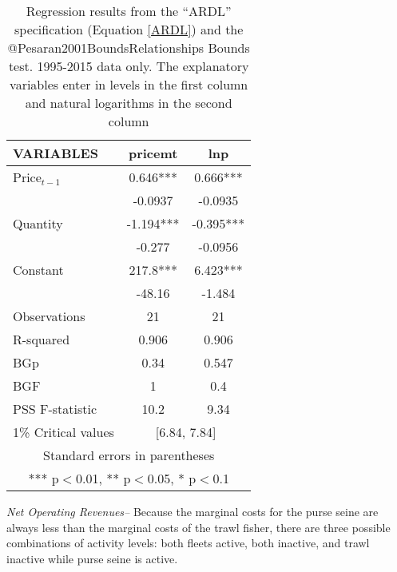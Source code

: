 \documentclass[]{article}
\begin{document}
\begin{table}[htbp]
\begin{center}
\begin{tabular}{lcc} \hline
VARIABLES       &   pricemt &   lnp \\\hline
Price$_{t-1}$       &   0.646***    &   0.666***    \\
        &   -0.0937 &   -0.0935 \\
Quantity        &   -1.194***   &   -0.395***   \\
        &   -0.277  &   -0.0956 \\
Constant        &   217.8***    &   6.423***    \\
        &   -48.16  &   -1.484  \\
Observations        &   21  &   21  \\
R-squared       &   0.906   &   0.906   \\
BGp     &   0.34    &   0.547   \\
BGF     &   1   &   0.4 \\
PSS F-statistic &   10.2    &   9.34    \\\hline
1\% Critical values &\multicolumn{2}{c}{[6.84, 7.84]} \\\hline
\multicolumn{3}{c}{ Standard errors in parentheses} \\
\multicolumn{3}{c}{ *** p$<$0.01, ** p$<$0.05, * p$<$0.1} \\\hline
\end{tabular}
\caption{Regression results from the ``ARDL'' specification (Equation \ref{ARDL}) and the @Pesaran2001BoundsRelationships Bounds test.  1995-2015 data only. The explanatory variables enter in levels in the first column and natural logarithms in the second column  \label{ardl_regression}}
\end{center}
\end{table}

\iffalse
Min-Yang will need to tighten this up 3. Figures and Tables

code for running regressions is here:
/home/mlee/Documents/Herring\_PDT\_work/Amendment8/MSE\_ABC/price\_things/
herring\_realprice\_timeseries.do herring\_realprice\_timeseries2.do \fi

\emph{Net Operating Revenues--} Because the marginal costs for the purse
seine are always less than the marginal costs of the trawl fisher, there
are three possible combinations of activity levels: both fleets active,
both inactive, and trawl inactive while purse seine is active.
\end{document}
